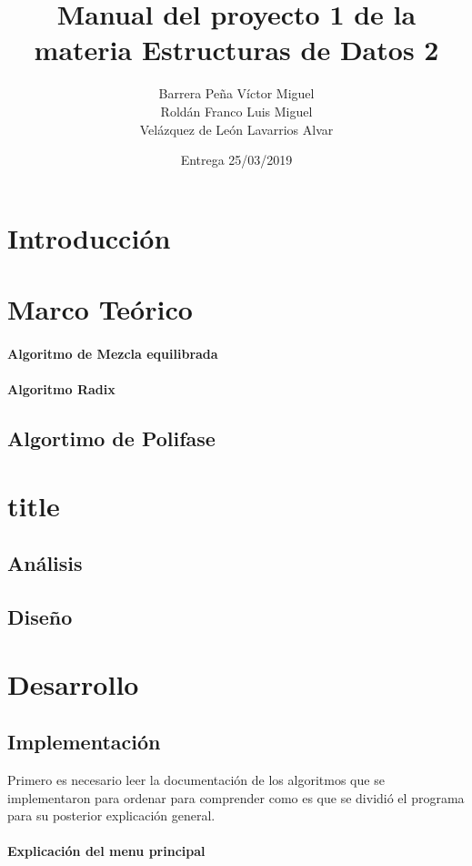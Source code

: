 \documentclass{article}
\title{Manual del proyecto 1 de la materia Estructuras de Datos 2}
\author{Barrera Peña Víctor Miguel \\
		Roldán Franco Luis Miguel \\
		Velázquez de León Lavarrios Alvar 
	 }
\date{Entrega 25/03/2019}
\begin{document}
	\maketitle
	\section{Introducción}
	\section{Marco Teórico}
		\paragraph{Algoritmo de Mezcla equilibrada}
		\paragraph{Algoritmo Radix}
		\subsection{Algortimo de Polifase}
		
		\section{title}
	\subsection{Análisis}
	\subsection{Diseño}
	\section{Desarrollo}
		
	\subsection{Implementación}
		Primero es necesario leer la documentación de los algoritmos que se implementaron para ordenar  para comprender como es que se dividió el programa para su posterior explicación general.
		
	
	\paragraph*{Explicación del menu principal}
	
\end{document}
